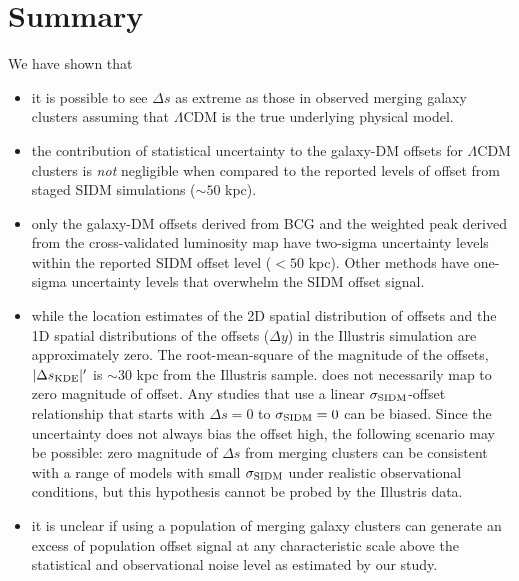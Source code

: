 \section{Summary}
We have shown that 
\begin{itemize}
		\item it is possible to  
			see $\Delta s$ as extreme as those in observed merging galaxy clusters assuming that
			$\Lambda$CDM is the true underlying physical model.  \\

		\item the contribution of statistical uncertainty to the galaxy-DM offsets 
			for $\Lambda$CDM clusters is {\it not} negligible when compared to the reported
			levels of offset from staged SIDM simulations ($\sim 50$ kpc).\\ 

		\item only the galaxy-DM offsets derived from BCG and the weighted peak
			derived from the cross-validated
			luminosity map have two-sigma uncertainty levels within the reported SIDM offset
			level ($< 50$ kpc). Other methods have one-sigma uncertainty levels that overwhelm the
			SIDM offset signal.\\ 

		\item while the location estimates of the 2D spatial distribution of offsets and the
			1D spatial distributions of the offsets ($\Delta y$) in the Illustris
			simulation are approximately zero.
			The root-mean-square of the magnitude of the
		offsets, $|\Delta s_{\rm KDE}|'$ is $\sim 30$ kpc from the Illustris sample. 
			does not necessarily map to zero magnitude of offset.  
			Any studies that use a linear $\sigma_{\rm SIDM}$-offset relationship
			that starts with $\Delta s = 0$ to $\sigma_{\rm SIDM} = 0$ can be biased. 
			Since the uncertainty does not always bias the offset high, 
		the following scenario may be possible: zero magnitude of
			$\Delta s$ from merging clusters 
			can be consistent with a range of models with small
			$\sigma_{\rm SIDM}$ under realistic observational conditions,
			but this hypothesis cannot be probed by the Illustris data.\\
  
	 \item it is unclear if using a population of merging galaxy clusters 
		 can generate an excess of population offset signal at any characteristic
		 scale above the statistical
		 and observational noise level as estimated by our study.   
			\\



\end{itemize}
